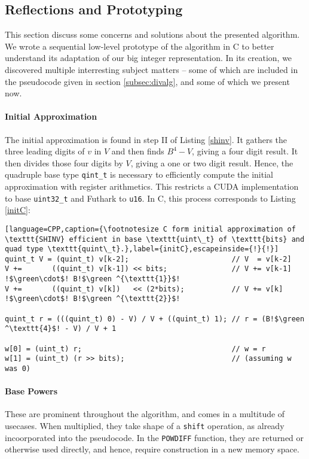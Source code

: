 \subsection{Reflections and Prototyping}
\label{subsec:divproto}

This section discuss some concerns and solutions about the presented
algorithm. We wrote a sequential low-level prototype of the algorithm in C to
better understand its adaptation of our big integer representation. In its
creation, we discovered multiple interresting subject matters -- some of which
are included in the pseudocode given in section \ref{subsec:divalg}, and some of
which we present now.

\paragraph{Initial Approximation}
The initial approximation is found in step II of Listing \ref{shinv}. It gathers
the three leading digits of $v$ in $V$ and then finds $B^4-V$, giving a four
digit result. It then divides those four digits by $V$, giving a one or two
digit result. Hence, the quadruple base type \texttt{qint\_t} is necessary to
efficiently compute the initial approximation with register arithmetics. This
restricts a CUDA implementation to base \texttt{uint32\_t} and Futhark to
\texttt{u16}. In C, this process corresponds to Listing \ref{initC}:
\begin{lstlisting}[language=CPP,caption={\footnotesize C form initial approximation of \texttt{SHINV} efficient in base \texttt{uint\_t} of \texttt{bits} and quad type \texttt{quint\_t}.},label={initC},escapeinside={!}{!}]
quint_t V = (quint_t) v[k-2];                        // V  = v[k-2]
V +=       ((quint_t) v[k-1]) << bits;               // V += v[k-1] !$\green\cdot$! B!$\green ^{\texttt{1}}$!
V +=       ((quint_t) v[k])   << (2*bits);           // V += v[k]   !$\green\cdot$! B!$\green ^{\texttt{2}}$!

quint_t r = (((quint_t) 0) - V) / V + ((quint_t) 1); // r = (B!$\green ^\texttt{4}$! - V) / V + 1

w[0] = (uint_t) r;                                   // w = r 
w[1] = (uint_t) (r >> bits);                         // (assuming w was 0)
\end{lstlisting}

\paragraph{Base Powers}
These are prominent throughout the algorithm, and comes in a multitude of
usecases. When multiplied, they take shape of a \texttt{shift} operation, as
already incoorporated into the pseudocode. In the \texttt{POWDIFF} function,
they are returned or otherwise used directly, and hence, require construction in
a new memory space.

